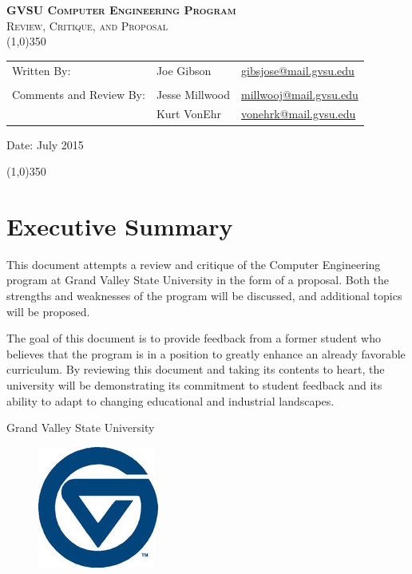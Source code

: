 \documentclass[12pt]{article}
\newcommand{\ASSNMT}{GVSU Computer Engineering Program}
\newcommand{\CLASS}{Review, Critique, and Proposal}
\newcommand{\Footer}{Grand Valley State University}
\newcommand{\DATE}{July 2015}
\numberwithin{figure}{section}
\numberwithin{equation}{section}
\begin{document}
\begin{flushleft}

\textsc{\LARGE \bfseries \ASSNMT}\\

\textsc{\Large \CLASS}\\[0.2cm]
\linethickness{0.5mm}
{\color{NavyBlue}\line(1,0){350}} \\ [1.0cm]

\begin{flushleft} \large
\begin{tabular}{lll}
Written By: & Joe Gibson    & \href{mailto:gibsjose@mail.gvsu.edu}{gibsjose@mail.gvsu.edu}\\
              &               & \\
Comments and Review By: & Jesse Millwood  &       \href{mailto:millwooj@mail.gvsu.edu}{millwooj@mail.gvsu.edu}\\
        & Kurt VonEhr     & \href{mailto:vonehrk@mail.gvsu.edu}{vonehrk@mail.gvsu.edu}\\
\end{tabular}

\bigskip

\bigskip
Date: \DATE
\end{flushleft}

\smallskip
{\color{NavyBlue}\line(1,0){350}} \\ [1.0cm]
\section*{Executive Summary} \label{sect:execsum}
This document attempts a review and critique of the Computer Engineering program at Grand Valley State University in the form of a proposal. Both the strengths and weaknesses of the program will be discussed, and additional topics will be proposed.

\bigskip

The goal of this document is to provide feedback from a former student who believes that the program is in a position to greatly enhance an already favorable curriculum. By reviewing this document and taking its contents to heart, the university will be demonstrating its commitment to student feedback and its ability to adapt to changing educational and industrial landscapes.

\vfill

\begin{center}
{\large \Footer}
\end{center}
\begin{figure}[H]
  \centering
  \includegraphics[width=.1\textwidth]{small_gvsu}
\end{figure}
\end{flushleft}
\end{document}
